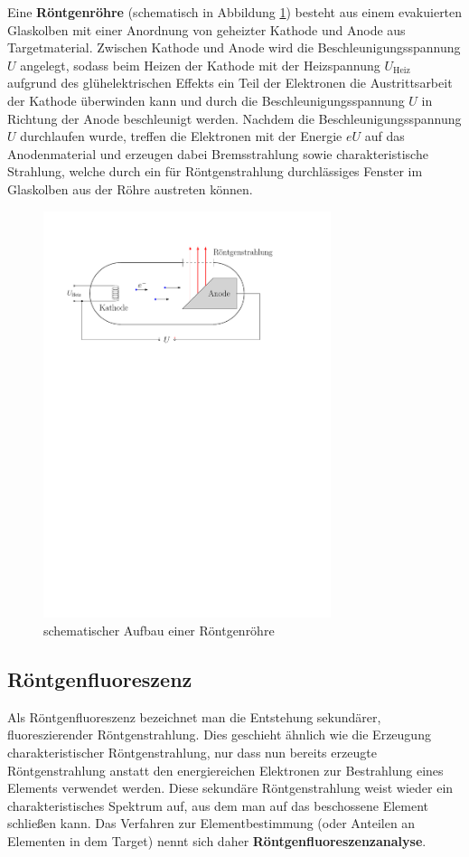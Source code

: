 \documentclass[11pt, a4paper]{article}
\begin{document}
Eine \textbf{Röntgenröhre} (schematisch in Abbildung \ref{fig:roehre}) besteht aus einem evakuierten Glaskolben mit einer Anordnung von geheizter Kathode und Anode aus Targetmaterial.
Zwischen Kathode und Anode wird die Beschleunigungsspannung $U$ angelegt, sodass beim Heizen der Kathode mit der Heizspannung $U_\mathrm{Heiz}$ aufgrund des glühelektrischen Effekts ein Teil der Elektronen die Austrittsarbeit der Kathode überwinden kann und durch die Beschleunigungsspannung $U$ in Richtung der Anode beschleunigt werden.
Nachdem die Beschleunigungsspannung $U$ durchlaufen wurde, treffen die Elektronen mit der Energie $e U$ auf das Anodenmaterial und erzeugen dabei Bremsstrahlung sowie charakteristische Strahlung, welche durch ein für Röntgenstrahlung durchlässiges Fenster im Glaskolben aus der Röhre austreten können.
\begin{figure}[h]
\centering
\includegraphics[width=0.75\textwidth]{./grafiken/roentgenroehre.pdf}
\caption{schematischer Aufbau einer Röntgenröhre}
\label{fig:roehre}
\end{figure}

\subsection{Röntgenfluoreszenz}
Als Röntgenfluoreszenz bezeichnet man die Entstehung sekundärer, fluoreszierender Röntgenstrahlung.
Dies geschieht ähnlich wie die Erzeugung charakteristischer Röntgenstrahlung, nur dass nun bereits erzeugte Röntgenstrahlung anstatt den energiereichen Elektronen zur Bestrahlung eines Elements verwendet werden.
Diese sekundäre Röntgenstrahlung weist wieder ein charakteristisches Spektrum auf, aus dem man auf das beschossene Element schließen kann.
Das Verfahren zur Elementbestimmung (oder Anteilen an Elementen in dem Target) nennt sich daher \textbf{Röntgenfluoreszenzanalyse}.
\end{document}
